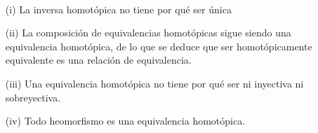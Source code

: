 \begin{observacion}\
    \begin{enumerate}
        \item[(i)] La inversa homotópica no tiene por qué ser única
        \item[(ii)] La composición de equivalencias homotópicas sigue siendo una equivalencia homotópica, de lo que se deduce que ser homotópicamente equivalente es una relación de equivalencia.
        \item[(iii)] Una equivalencia homotópica no tiene por qué ser ni inyectiva ni sobreyectiva. 
        \item[(iv)] Todo heomorfismo es una equivalencia homotópica.
    \end{enumerate}
\end{observacion}

